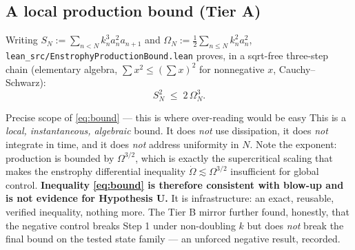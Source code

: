 \documentclass[11pt,a4paper]{article}
\newcommand{\tA}{\textcolor{TierA}{\textbf{Tier A}}}
\theoremstyle{definition}
\theoremstyle{plain}
\begin{document}
\subsection{A local production bound (\tA{})}

Writing $S_N:=\sum_{n<N}k_n^3a_n^2a_{n+1}$ and $\Omega_N:=\tfrac12\sum_{n\le N}k_n^2a_n^2$,
\texttt{lean\_src/EnstrophyProductionBound.lean} proves, in a sqrt-free three-step chain
(elementary algebra, $\sum x^2\le(\sum x)^2$ for nonnegative $x$, Cauchy--Schwarz):
\begin{equation}
S_N^2 \;\le\; 2\,\Omega_N^3 .
\label{eq:bound}
\end{equation}

\begin{warnbox}{Precise scope of \eqref{eq:bound} --- this is where over-reading would be easy}
This is a \emph{local, instantaneous, algebraic} bound. It does \emph{not} use dissipation, it
does \emph{not} integrate in time, and it does \emph{not} address uniformity in $N$. Note the
exponent: production is bounded by $\Omega^{3/2}$, which is exactly the supercritical scaling
that makes the enstrophy differential inequality $\dot\Omega\lesssim\Omega^{3/2}$ insufficient
for global control. \textbf{Inequality \eqref{eq:bound} is therefore consistent with blow-up
and is not evidence for Hypothesis U.} It is infrastructure: an exact, reusable, verified
inequality, nothing more. The Tier B mirror further found, honestly, that the negative control
breaks Step 1 under non-doubling $k$ but does \emph{not} break the final bound on the tested
state family --- an unforced negative result, recorded.
\end{warnbox}
\end{document}
